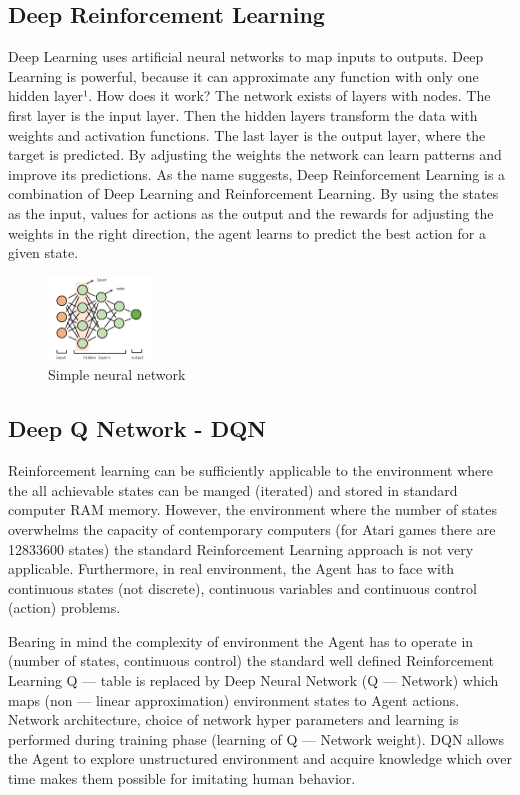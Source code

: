 \documentclass[11pt]{article}
\begin{document}
\subsection{Deep Reinforcement Learning}
Deep Learning uses artificial neural networks to map inputs to outputs. Deep Learning is powerful, because it can approximate any function with only one hidden layer¹. 
How does it work? The network exists of layers with nodes. The first layer is the input layer. Then the hidden layers transform the data with weights and activation functions. The last layer is the output layer, where the target is predicted. 
By adjusting the weights the network can learn patterns and improve its predictions.
As the name suggests, Deep Reinforcement Learning is a combination of Deep Learning and Reinforcement Learning. By using the states as the input, values for actions as the output and the rewards for adjusting the weights in the right direction, 
the agent learns to predict the best action for a given state.
\begin{figure}[h]
    \centering
    \includegraphics[width=0.25\textwidth]{neural-net}
    \caption{Simple neural network}
    \label{fig:neural_net}
\end{figure}


\pagebreak
\subsection{Deep Q Network - DQN}
Reinforcement learning can be sufficiently applicable to the environment where the all achievable states can be manged (iterated) and stored in standard computer RAM memory. However, the environment where the number of states overwhelms the 
capacity of contemporary computers (for Atari games there are 12833600 states) the standard Reinforcement Learning approach is not very applicable. Furthermore, in real environment, the Agent has to face with continuous states (not discrete), continuous variables and continuous control (action) problems.

Bearing in mind the complexity of environment the Agent has to operate in (number of states, continuous control) the standard well defined Reinforcement Learning Q — table is replaced by Deep Neural Network (Q — Network) which maps (non — linear approximation) environment states to Agent actions. Network architecture, choice of network hyper parameters and learning is performed during training phase (learning of Q — Network weight).
DQN allows the Agent to explore unstructured environment and acquire knowledge which over time makes them possible for imitating human behavior.
\end{document}
